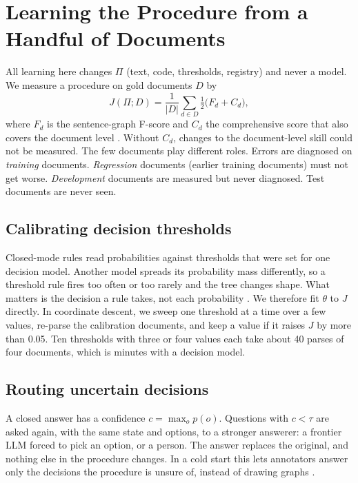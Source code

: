 \section{Learning the Procedure from a Handful of Documents}
\label{sec:learning}

All learning here changes $\Pi$ (text, code, thresholds, registry) and never a model. We measure a procedure on gold documents $D$ by
\begin{equation}
J(\Pi; D) = \frac{1}{|D|}\sum_{d \in D} \tfrac{1}{2}\bigl(F_d + C_d\bigr),
\label{eq:objective}
\end{equation}
where $F_d$ is the sentence-graph F-score and $C_d$ the comprehensive score that also covers the document level \citep{sun2024ancast}. Without $C_d$, changes to the document-level skill could not be measured. The few documents play different roles. Errors are diagnosed on \emph{training} documents. \emph{Regression} documents (earlier training documents) must not get worse. \emph{Development} documents are measured but never diagnosed. Test documents are never seen.

\subsection{Calibrating decision thresholds}
\label{sec:calibration}
Closed-mode rules read probabilities against thresholds that were set for one decision model. Another model spreads its probability mass differently, so a threshold rule fires too often or too rarely and the tree changes shape. What matters is the decision a rule takes, not each probability \citep[cf.][]{zhao2021calibrate}. We therefore fit $\theta$ to $J$ directly. In coordinate descent, we sweep one threshold at a time over a few values, re-parse the calibration documents, and keep a value if it raises $J$ by more than 0.05. Ten thresholds with three or four values each take about 40 parses of four documents, which is minutes with a decision model.

\subsection{Routing uncertain decisions}
\label{sec:routing}
A closed answer has a confidence $c=\max_o p(o)$. Questions with $c<\tau$ are asked again, with the same state and options, to a stronger answerer: a frontier LLM forced to pick an option, or a person. The answer replaces the original, and nothing else in the procedure changes. In a cold start this lets annotators answer only the decisions the procedure is unsure of, instead of drawing graphs .

